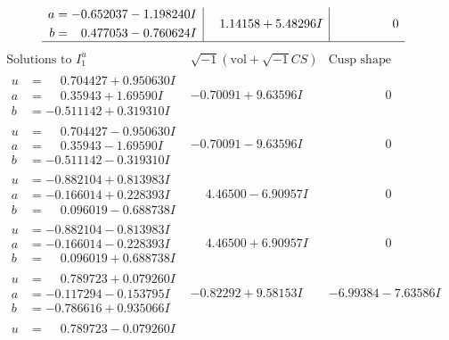\documentclass[1p]{elsarticle_modified}
\theoremstyle{definition}
\newcommand{\I}{\sqrt{-1}}
\begin{document}
$$\begin{array}{c|c|c}
\begin{aligned}
a &= -0.652037 - 1.198240 I \\
b &= \phantom{-}0.477053 - 0.760624 I\end{aligned}
 & \phantom{-}1.14158 + 5.48296 I & \phantom{-0.000000 } 0\\
 \hline 
 \end{array}$$\newpage$$\begin{array}{c|c|c}  
\text{Solutions to }I^u_{1}& \I (\text{vol} + \sqrt{-1}CS) & \text{Cusp shape}\\
 \hline 
\begin{aligned}
u &= \phantom{-}0.704427 + 0.950630 I \\
a &= \phantom{-}0.35943 + 1.69590 I \\
b &= -0.511142 + 0.319310 I\end{aligned}
 & -0.70091 + 9.63596 I & \phantom{-0.000000 } 0 \\ \hline\begin{aligned}
u &= \phantom{-}0.704427 - 0.950630 I \\
a &= \phantom{-}0.35943 - 1.69590 I \\
b &= -0.511142 - 0.319310 I\end{aligned}
 & -0.70091 - 9.63596 I & \phantom{-0.000000 } 0 \\ \hline\begin{aligned}
u &= -0.882104 + 0.813983 I \\
a &= -0.166014 + 0.228393 I \\
b &= \phantom{-}0.096019 - 0.688738 I\end{aligned}
 & \phantom{-}4.46500 - 6.90957 I & \phantom{-0.000000 } 0 \\ \hline\begin{aligned}
u &= -0.882104 - 0.813983 I \\
a &= -0.166014 - 0.228393 I \\
b &= \phantom{-}0.096019 + 0.688738 I\end{aligned}
 & \phantom{-}4.46500 + 6.90957 I & \phantom{-0.000000 } 0 \\ \hline\begin{aligned}
u &= \phantom{-}0.789723 + 0.079260 I \\
a &= -0.117294 - 0.153795 I \\
b &= -0.786616 + 0.935066 I\end{aligned}
 & -0.82292 + 9.58153 I & -6.99384 - 7.63586 I \\ \hline\begin{aligned}
u &= \phantom{-}0.789723 - 0.079260 I \\

\end{aligned}
\end{array}$$
\end{document}
